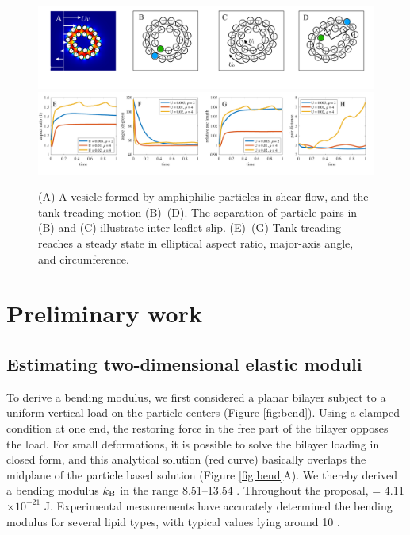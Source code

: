 \begin{figure}[!]
\begin{center}
\includegraphics[width=1\textwidth]{figures/PW_fig1A-D.pdf}
\includegraphics[width=1\textwidth]{figures/PW_fig1E-H.pdf}
\end{center}
\vspace{-0.3in}
\caption{\label{fig:tanktreading}\footnotesize (A) A vesicle formed by
  amphiphilic particles in shear flow, and the tank-treading motion
  (B)--(D). The separation of particle pairs in (B) and (C) illustrate
  inter-leaflet slip.  (E)--(G) Tank-treading reaches a steady state in
  elliptical aspect ratio, major-axis angle, and circumference.}
\end{figure}


\section{Preliminary work}
\subsection{Estimating two-dimensional elastic
moduli}

To derive a bending modulus, we first considered a planar bilayer subject to a uniform vertical load on the particle centers (Figure \ref{fig:bend}). 
Using a clamped condition at one end, the restoring force in the free part of the bilayer opposes the load.
For small deformations, it is possible to solve the bilayer loading in closed form, and 
this analytical solution (red curve) basically overlaps the midplane of the particle based solution (Figure \ref{fig:bend}A).
We thereby derived a bending modulus $k_{\mathrm{B}}$ in the range 8.51--13.54 \kBT. Throughout the proposal, \kBT\; = 4.11$\times 10^{-21}$ J.
Experimental measurements have accurately determined the bending modulus for several lipid types, with 
typical values lying around 10 \kBT\; \cite{Naetal15,VeBrPa15,NAGLE2000159,PhysRevLett.113.248102}.

